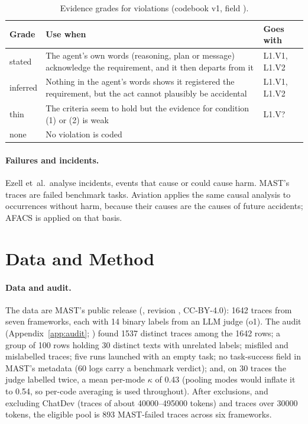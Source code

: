 \documentclass[11pt]{article}
\begin{document}
\begin{table}[tbp]
\centering
\caption{Evidence grades for violations (codebook v1, field ).}
\label{tab:evidence}
\small
\begin{tabular}{@{}lL{9.8cm}l@{}}
\toprule
Grade & Use when & Goes with\\
\midrule
stated & The agent's own words (reasoning, plan or message) acknowledge the requirement, and it then departs from it & L1.V1, L1.V2\\
inferred & Nothing in the agent's words shows it registered the requirement, but the act cannot plausibly be accidental & L1.V1, L1.V2\\
thin & The criteria seem to hold but the evidence for condition (1) or (2) is weak & L1.V?\\
none & No violation is coded & \\
\bottomrule
\end{tabular}
\end{table}

\paragraph{Failures and incidents.} Ezell et~al.\ analyse incidents, events that
cause or could cause harm. MAST's traces are failed benchmark tasks. Aviation
applies the same causal analysis to occurrences without harm, because their
causes are the causes of future accidents; AFACS is applied on that basis.

\section{Data and Method}
\label{sec:method}

\paragraph{Data and audit.}
\label{sec:audit}
The data are MAST's public release (, revision
, CC-BY-4.0): \num{1642} traces from seven frameworks, each with 14
binary labels from an LLM judge (o1). The audit (Appendix~\ref{app:audit};
) found \num{1537} distinct traces among the \num{1642} rows;
a group of 100 rows holding 30 distinct texts with unrelated labels; misfiled and
mislabelled traces; five runs launched with an empty task; no task-success field in
MAST's metadata (60 logs carry a benchmark verdict); and, on 30 traces the judge labelled twice, a mean per-mode $\kappa$ of
0.43 (pooling modes would inflate it to 0.54, so per-code averaging is used
throughout). After exclusions, and excluding ChatDev (traces of about \num{40000}--\num{495000}
tokens) and traces over \num{30000} tokens, the eligible pool is 893 MAST-failed
traces across six frameworks.
\end{document}
